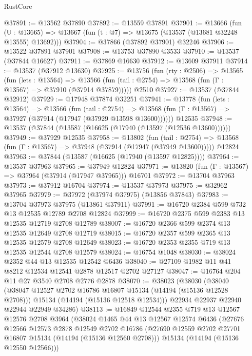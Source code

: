 \begin{lexlean}{RustCore}
\begin{coremodule}
@37891 := @13562 @37890
@37892 := @13559 @37891
@37901 := @13666
    (fun (U : @13665) => @13667 (fun (t : @7) => @13675 (@13537 (@13681 @32248 @13555) @13692)))
@37904 := @37866 (@37892 @37901) @32246
@37906 := @13522 @37891 @37901
@37908 := @13753 @37890 @3533
@37910 := @13537 (@37844 @16627)
@37911 := @37869 @16630
@37912 := @13609 @37911
@37914 := @13537 (@37912 @13630)
@37925 := @13756
    (fun (rty : @2506) =>
    @13565
      (fun (lets : @13564) =>
      @13566 (fun (tail : @2754) => @13568 (fun (Γ : @13567) => @37910 (@37914 @37879)))))
    @2510
@37927 := @13537 (@37844 @32912)
@37929 := @17948 @37874 @32251
@37941 := @13778
    (fun (lets : @13564) =>
    @13566
      (fun (tail : @2754) =>
      @13568 (fun (Γ : @13567) => @37927 (@37914 (@17947 (@37929 @13598 @13600))))))
    @12535
@37948 := @13537 (@37844 (@13587 (@16625 (@17940 (@13597 (@12536 @13600))))))
@37949 := @37929 @12535
@37958 := @13802
    (fun (tail : @2754) => @13568 (fun (Γ : @13567) => @37948 (@37914 (@17947 (@37949 @13600)))))
    @12824
@37963 := @37844 (@13587 (@16625 (@17940 (@13597 @12825))))
@37964 := @13537 @37963
@37965 := @37949 @12824
@37971 := @13820 (fun (Γ : @13567) => @37964 (@37914 (@17947 @37965))) @16701
@37972 := @13704 @37963
@37973 := @37912 @16704
@37974 := @13537 @37973
@37975 := @32962 @37965
@37979 := @37972 (@37974 @37975) (@13856 @37843)
@37983 := @13704 @37973 @37975 (@13861 @37911)
@37991 := @16720 @2384 @599 @732 @13 @12535 @12789 @2708 @12824
@37999 := @16720 @2375 @599 @2383 @13 @12535 @12719 @2708 @12789
@38007 := @16720 @2366 @599 @2374 @13 @12535 @12649 @2708 @12719
@38015 := @16720 @2357 @599 @2365 @13 @12535 @12579 @2708 @12649
@38023 := @16720 @2353 @2355 @719 @13 @12535 @12544 @2708 @12579
@38024 := @16754 @1048
@38030 := @38024 @2352 @44 @13 @12535 @12542 @6436
@38040 := @27109 @1982 @11 @41 @8212 @12534 @12541 @2878 @12517 @2702 @27127
@38047 := @16764 @204 @11 @27 @3540 @2708 @2776 @2878
@38070 := @38023
    (@38030
      (@38040
        (@38047 @12527 @2702 @16786 @16807 @15134 (@14194 (@15136 @12528 @2708)))
        @15134
        (@14194 (@15136 @12518 @12534)))
      @22934
      @22937
      @22940
      @22944
      @22949
      @34286)
@38113 := @16849
    @12544
    @2355
    @719
    @13
    @12567
    @12576
    @2708
    @3964
    (@38024
      @1465
      @44
      @13
      @12567
      @12574
      @6436
      (@27676
        @12566
        @12573
        @2878
        @12549
        @2702
        @16786
        (@27690 @12559 @2702 @27701 @16807 @15134 (@14194 (@15136 @12560 @2708)))
        @15134
        (@14194 (@15136 @12550 @12566)))

\end{coremodule}
\end{lexlean}
